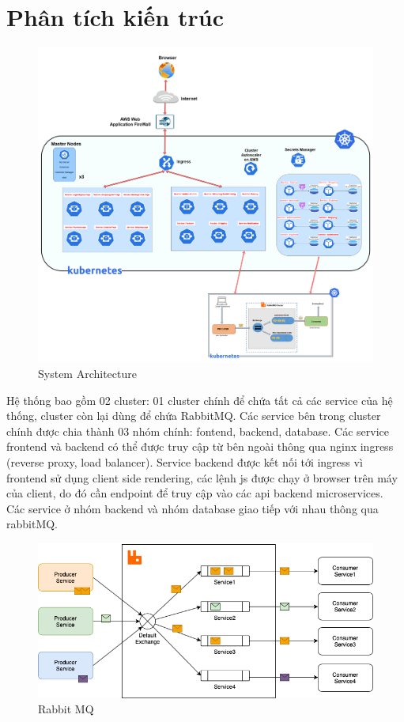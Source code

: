\section{Phân tích kiến trúc}
 \begin{figure}[H]
    \begin{center}
    \includegraphics[scale = 0.13]{images/phat/Architech_System.png}
    \vspace*{7mm}
    \caption{System Architecture}
    \end{center}
    \label{}
\end{figure}
\noindent Hệ thống bao gồm 02 cluster: 01 cluster chính để chứa tất cả các service của hệ thống, cluster còn lại dùng để chứa RabbitMQ. Các service bên trong cluster chính được chia thành 03 nhóm chính: fontend, backend, database. Các service frontend và backend có thể được truy cập từ bên ngoài thông qua nginx ingress (reverse proxy, load balancer). Service backend được kết nối tới ingress vì frontend sử dụng client side rendering, các lệnh js được chạy ở browser trên máy của client, do đó cần endpoint để truy cập vào các api backend microservices. Các service ở nhóm backend và nhóm database giao tiếp với nhau thông qua rabbitMQ.
\begin{figure}[H]
    \begin{center}
    \includegraphics[scale = 0.55]{images/phat/rabbitMQ.png}
    \vspace*{7mm}
    \caption{Rabbit MQ}
    \end{center}
    \label{}
\end{figure}
